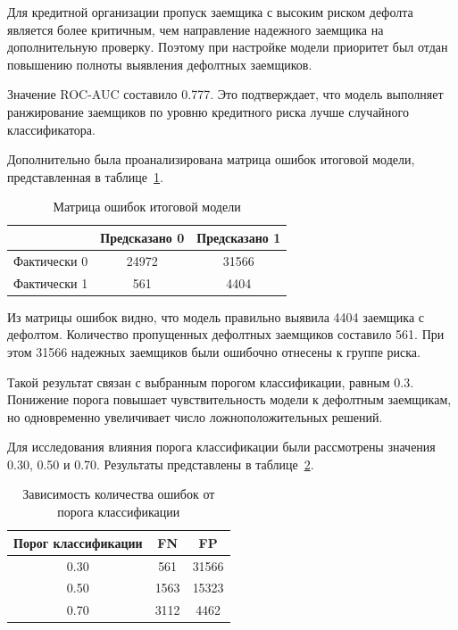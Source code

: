 Для кредитной организации пропуск заемщика с высоким риском дефолта является более критичным, чем направление надежного заемщика на дополнительную проверку. Поэтому при настройке модели приоритет был отдан повышению полноты выявления дефолтных заемщиков.

Значение ROC-AUC составило 0.777. Это подтверждает, что модель выполняет ранжирование заемщиков по уровню кредитного риска лучше случайного классификатора.

Дополнительно была проанализирована матрица ошибок итоговой модели, представленная в таблице~\ref{tab:research_confusion_matrix}.

\begin{table}[ht!]
    \centering
    \caption{Матрица ошибок итоговой модели}
    \label{tab:research_confusion_matrix}
    \begin{tabular}{|c|c|c|}
        \hline
                     & Предсказано 0 & Предсказано 1 \\
        \hline
        Фактически 0 & 24972         & 31566         \\
        \hline
        Фактически 1 & 561           & 4404          \\
        \hline
    \end{tabular}
\end{table}

Из матрицы ошибок видно, что модель правильно выявила 4404 заемщика с дефолтом. Количество пропущенных дефолтных заемщиков составило 561. При этом 31566 надежных заемщиков были ошибочно отнесены к группе риска.

Такой результат связан с выбранным порогом классификации, равным 0.3. Понижение порога повышает чувствительность модели к дефолтным заемщикам, но одновременно увеличивает число ложноположительных решений.

Для исследования влияния порога классификации были рассмотрены значения 0.30, 0.50 и 0.70. Результаты представлены в таблице~\ref{tab:research_threshold}.

\begin{table}[ht!]
    \centering
    \caption{Зависимость количества ошибок от порога классификации}
    \label{tab:research_threshold}
    \begin{tabular}{|c|c|c|}
        \hline
        Порог классификации & FN   & FP    \\
        \hline
        0.30                & 561  & 31566 \\
        \hline
        0.50                & 1563 & 15323 \\
        \hline
        0.70                & 3112 & 4462  \\
        \hline
    \end{tabular}
\end{table}

